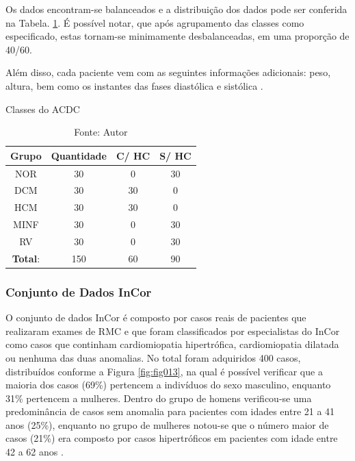 Os dados encontram-se balanceados e a distribuição dos dados pode ser conferida na Tabela. \ref{tab:count_dataset}. É possível notar, que após agrupamento das classes como especificado, estas tornam-se minimamente desbalanceadas, em uma proporção de 40/60.

Além disso, cada paciente vem com as seguintes informações adicionais: peso, altura, bem como os instantes das fases diastólica e sistólica \cite{bernardDeepLearningTechniques2018a}.

\begin{table}[hbtp]
    \centering
    \caption{Classes do ACDC}
    \renewcommand{\arraystretch}{1} %
    \begin{tabular}{|c|c|c|c|}
    \hline 
          \textbf{Grupo} & \textbf{Quantidade} & \textbf{C/ HC} & \textbf{S/ HC}  \\ 
    \hline 
        NOR & 30 & 0 & 30 \\ 
        DCM & 30 & 30 & 0\\ 
        HCM & 30 & 30 & 0\\ 
        MINF & 30 & 0 & 30 \\ 
        RV & 30 & 0 & 30 \\
    \hline 
        \textbf{Total}: & 150  & 60 & 90\\ 
    \hline 
    \end{tabular} 
    \caption*{Fonte: Autor}
    \label{tab:count_dataset}
\end{table}

\subsubsection{Conjunto de Dados InCor} 
\label{subsec:cap4_incor}

O conjunto de dados \gls{InCor} é composto por casos reais de pacientes que realizaram exames de \gls{RMC} e que foram classificados por especialistas do \gls{InCor} como casos que continham cardiomiopatia hipertrófica, cardiomiopatia dilatada ou nenhuma das duas anomalias. No total foram adquiridos 400 casos, distribuídos conforme a Figura \ref{fig:fig013}, na qual é possível verificar que a maioria dos casos (69\%) pertencem a indivíduos do sexo masculino, enquanto 31\% pertencem a mulheres. Dentro do grupo de homens verificou-se uma predominância de casos sem anomalia para pacientes com idades entre 21 a 41 anos (25\%), enquanto no grupo de mulheres notou-se que o número maior de casos (21\%) era composto por casos hipertróficos em pacientes com idade entre 42 a 62 anos \cite{bergamascoRECUPERACAOOBJETOSMEDICOS2018}.

